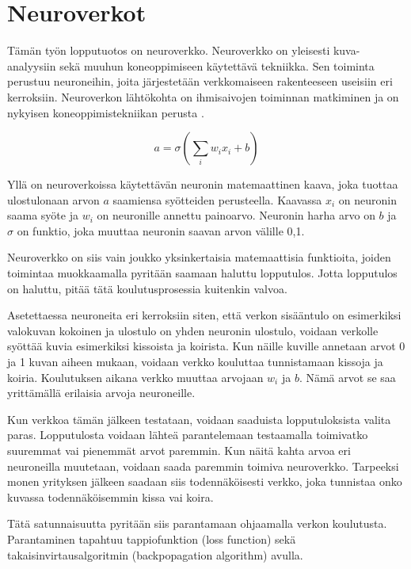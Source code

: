 \section{Neuroverkot} 

Tämän työn lopputuotos on neuroverkko.  
Neuroverkko on yleisesti kuva-analyysiin sekä muuhun koneoppimiseen käytettävä tekniikka.  
Sen toiminta perustuu neuroneihin, joita järjestetään verkkomaiseen rakenteeseen useisiin eri kerroksiin.
Neuroverkon lähtökohta on ihmisaivojen toiminnan matkiminen ja on nykyisen koneoppimistekniikan perusta \cite{PhamTrungQuang2023EotH}.

\begin{equation}\label{yht:neuroni}
    a = \sigma\left(\sum_i w_i x_i + b\right)
\end{equation}

Yllä on neuroverkoissa käytettävän neuronin matemaattinen kaava,
joka tuottaa ulostulonaan arvon \(a\) saamiensa syötteiden perusteella.  
Kaavassa \(x_i\) on neuronin saama syöte ja  
\(w_i\) on neuronille annettu painoarvo.
Neuronin harha arvo on \(b\) ja \(\sigma\) on funktio, joka muuttaa neuronin saavan arvon välille 0,1.

Neuroverkko on siis vain joukko yksinkertaisia matemaattisia funktioita,
joiden toimintaa muokkaamalla pyritään saamaan haluttu lopputulos.
Jotta lopputulos on haluttu, pitää tätä koulutusprosessia kuitenkin valvoa.


Asetettaessa neuroneita eri kerroksiin siten, että verkon sisääntulo on esimerkiksi valokuvan kokoinen
ja ulostulo on yhden neuronin ulostulo, 
voidaan verkolle syöttää kuvia esimerkiksi kissoista ja koirista.
Kun näille kuville annetaan arvot 0 ja 1 kuvan aiheen mukaan, voidaan verkko kouluttaa tunnistamaan kissoja ja koiria.
Koulutuksen aikana verkko muuttaa arvojaan \(w_i\) ja \(b\).
Nämä arvot se saa yrittämällä erilaisia arvoja neuroneille.

Kun verkkoa tämän jälkeen testataan, voidaan saaduista lopputuloksista valita paras.
Lopputulosta voidaan lähteä parantelemaan testaamalla toimivatko suuremmat vai pienemmät arvot paremmin.
Kun näitä kahta arvoa eri neuroneilla muutetaan, voidaan saada paremmin toimiva neuroverkko.
Tarpeeksi monen yrityksen jälkeen saadaan siis todennäköisesti verkko, joka tunnistaa onko kuvassa todennäköisemmin kissa vai koira.

Tätä satunnaisuutta pyritään siis parantamaan ohjaamalla verkon koulutusta.
Parantaminen tapahtuu tappiofunktion (loss function) sekä takaisinvirtausalgoritmin (backpopagation algorithm) avulla.

